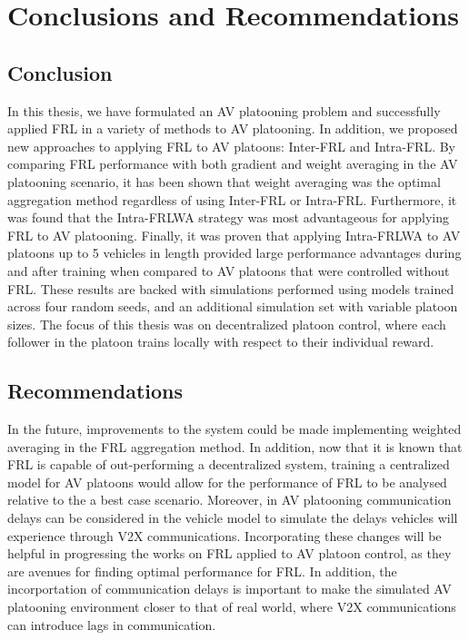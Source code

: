 \chapter{Conclusions and Recommendations} \label{chap:conclusion}
\section{Conclusion}
In this thesis, we have formulated an AV platooning problem and successfully applied FRL in
a variety of methods to AV platooning. In addition, we proposed new approaches to applying
FRL to AV platoons: Inter-FRL and Intra-FRL.  By comparing FRL performance with both
gradient and weight averaging in the AV platooning scenario, it has been shown that
weight averaging was the optimal aggregation method regardless of using Inter-FRL or
Intra-FRL.  Furthermore, it was found that the Intra-FRLWA strategy was most advantageous
for applying FRL to AV platooning.  Finally, it was proven that applying Intra-FRLWA to
AV platoons up to 5 vehicles in length provided large performance advantages during and
after training when compared to AV platoons that were controlled without FRL. These
results are backed with simulations performed using models trained across four random
seeds, and an additional simulation set with variable platoon sizes.  The focus of this
thesis was on decentralized platoon control, where each follower in the platoon trains
locally with respect to their individual reward.

\section{Recommendations}
In the future, improvements to the system could be made implementing weighted averaging in
the FRL aggregation method. In addition, now that it is known that FRL is capable of out-performing
a decentralized system, training a centralized model for AV platoons
would allow for the performance of FRL to be analysed relative to the a best case scenario.
Moreover, in AV platooning communication delays can be
considered in the vehicle model to simulate the delays vehicles will experience through V2X
communications. Incorporating these changes will be helpful in progressing the works on FRL applied to AV
platoon control, as they are avenues for finding optimal performance for FRL. In addition,
the incorportation of communication delays is important to make the simulated AV platooning
environment closer to that of real world, where V2X communications can introduce lags in communication.
